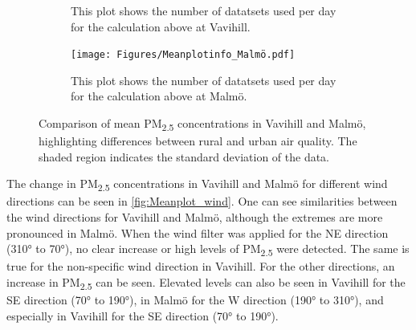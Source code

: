 \begin{figure}[H]
\begin{subfigure}[b]{0.49\textwidth}
        \caption{This plot shows the number of datatsets used per day for the calculation above at Vavihill.}
        \label{fig:Meanplotinfo_Vavihill}
    \end{subfigure}
    \hfill
    \begin{subfigure}[b]{0.49\textwidth}
        \centering
        \texttt{[image: Figures/Meanplotinfo\_Malmö.pdf]}
        \caption{This plot shows the number of datatsets used per day for the calculation above at Malmö.}
        \label{fig:Meanplotinfo_Malmö}
    \end{subfigure}
    \caption{Comparison of mean PM\textsubscript{2.5} concentrations in Vavihill and Malmö, highlighting differences between rural and urban air quality. The shaded region indicates the standard deviation of the data.}
    \label{fig:Meanplot_Comparison}
\end{figure}

The change in PM\textsubscript{2.5} concentrations in Vavihill and Malmö for different wind directions can be seen in \autoref{fig:Meanplot_wind}. One can see similarities between the wind directions for Vavihill and Malmö, although the extremes are more pronounced in Malmö. When the wind filter was applied for the NE direction (310° to 70°), no clear increase or high levels of PM\textsubscript{2.5} were detected. The same is true for the non-specific wind direction in Vavihill. For the other directions, an increase in PM\textsubscript{2.5} can be seen. Elevated levels can also be seen in Vavihill for the SE direction (70° to 190°), in Malmö for the W direction (190° to 310°), and especially in Vavihill for the SE direction (70° to 190°).

